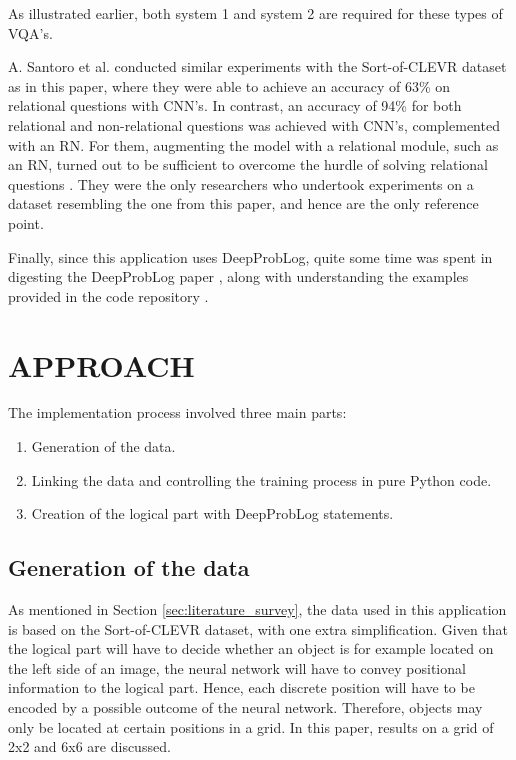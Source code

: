 \documentclass[english]{sobraep}
\begin{document}
As illustrated earlier, both system 1 and system 2 are required for these types of VQA's.

A. Santoro et al. conducted similar experiments with the Sort-of-CLEVR dataset as in this paper, where they were able to achieve an accuracy of 63\% on relational questions with CNN's. In contrast, an accuracy of 94\% for both relational and non-relational questions was achieved with CNN's, complemented with an RN. For them, augmenting the model with a relational module, such as an RN, turned out to be sufficient to overcome the hurdle of solving relational questions \cite{sort_of_clevr_dataset}. They were the only researchers who undertook experiments on a dataset resembling the one from this paper, and hence are the only reference point.

Finally, since this application uses DeepProbLog, quite some time was spent in digesting the DeepProbLog paper \cite{deepproblog}, along with understanding the  examples provided in the code repository \cite{deepproblog_code}.

\section{APPROACH}
\label{sec:approach}
The implementation process involved three main parts:
\begin{enumerate}
    \item Generation of the data.
    \item Linking the data and controlling the training process in pure Python code.
    \item Creation of the logical part with DeepProbLog statements.
\end{enumerate}

\subsection{Generation of the data}
As mentioned in Section \ref{sec:literature_survey}, the data used in this application is based on the Sort-of-CLEVR dataset, with one extra simplification. Given that the logical part will have to decide whether an object is for example located on the left side of an image, the neural network will have to convey positional information to the logical part. Hence, each discrete position will have to be encoded by a possible outcome of the neural network. Therefore, objects may only be located at certain positions in a grid. In this paper, results on a grid of 2x2 and 6x6 are discussed.
\end{document}
